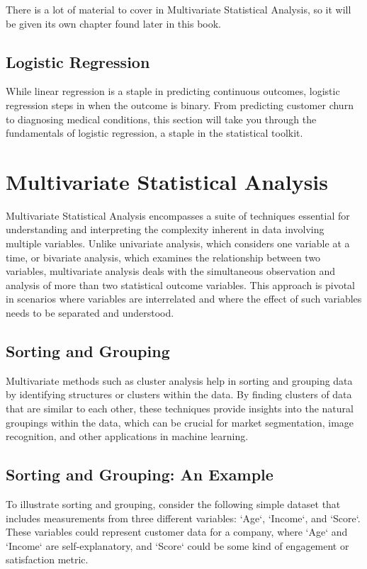 \documentclass[a4paper,12pt]{book}
\begin{document}
There is a lot of material to cover in Multivariate Statistical Analysis, so it will be given its own chapter found later in this book.

\section{Logistic Regression}
While linear regression is a staple in predicting continuous outcomes, logistic regression steps in when the outcome is binary. From predicting customer churn to diagnosing medical conditions, this section will take you through the fundamentals of logistic regression, a staple in the statistical toolkit.

\chapter{Multivariate Statistical Analysis}
\label{chap:multivariate_statistical_analysis}

Multivariate Statistical Analysis encompasses a suite of techniques essential for understanding and interpreting the complexity inherent in data involving multiple variables. Unlike univariate analysis, which considers one variable at a time, or bivariate analysis, which examines the relationship between two variables, multivariate analysis deals with the simultaneous observation and analysis of more than two statistical outcome variables. This approach is pivotal in scenarios where variables are interrelated and where the effect of such variables needs to be separated and understood.

\section{Sorting and Grouping}
Multivariate methods such as cluster analysis help in sorting and grouping data by identifying structures or clusters within the data. By finding clusters of data that are similar to each other, these techniques provide insights into the natural groupings within the data, which can be crucial for market segmentation, image recognition, and other applications in machine learning.

\section{Sorting and Grouping: An Example}
To illustrate sorting and grouping, consider the following simple dataset that includes measurements from three different variables: `Age`, `Income`, and `Score`. These variables could represent customer data for a company, where `Age` and `Income` are self-explanatory, and `Score` could be some kind of engagement or satisfaction metric.
\end{document}
